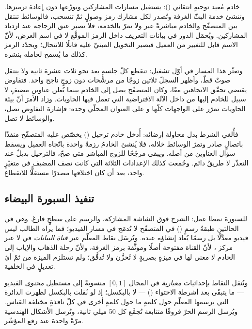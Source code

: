 خادم  مُعيد توجيهٍ انتقائي (): يستقبل مسارات المشاركين ويوزّعها دون إعادة ترميزها. وتنشئ خدمة البثّ الغرفة وتُصدر لكل مشارك رمز وصولٍ ثمّ تنسحب، فالوسائط تنتقل بين المتصفّح والخادم مباشرةً عبر  ولا تمرّ بالخدمة، فلا تصير عنق الزجاجة عند ازدياد المشاركين. ويُحمَل الدور في بيانات التعريف داخل الرمز الموقَّع لا في اسم العرض، لأنّ الاسم قابل للتغيير من العميل فيصير التخويل المبنيّ عليه قابلًا للانتحال؛ ويحدّد الرمز كذلك ما يُسمح لحامله بنشره.

وتعثّر هذا المسار في أوّل تشغيل: تنقطع كلّ جلسةٍ بعد نحو ثلاث عشرة ثانية ولا ينتقل صوتٌ قطّ، وأظهر السجلّ ثلاثين زوجًا من مرشَّحات  دون زوجٍ ناجح واحد. فتفاوض  يقتضي تحقّق الاتجاهين معًا، وكان المتصفّح يصل إلى الخادم بينما يُعلن عناوين مضيفٍ لا سبيل للخادم إليها من داخل الآلة الافتراضية التي تعمل فيها الحاويات. وزاد الأمرَ أنّ بيئة الحاويات تمرّر  على الواجهات كلّها و على العنوان المحلّي وحده: فإشارة التفاوض تصل، والوسائط لا تصل.

فأُلغي الشرط بدل محاولة إرضائه: أُدخل خادم ترحيل () يخصّص عليه المتصفّح منفذًا باتصالٍ صادر وتمرّ الوسائط خلاله، فلا يُنشئ الخادمُ رزمةً واحدة باتّجاه العميل ويسقط سؤال العناوين من أصله. ويبقى  مرجّحًا للزوج المباشر متى صحّ، فالترحيل بديلٌ عند التعذّر لا طريقٌ دائم. وجُمعت كذلك الإعدادات الثلاثة التي كانت تصف المضيف في متغيّرٍ واحد، بعد أن كان اختلافها مصدرًا مستقلًّا للانقطاع.

\subsection{تنفيذ السبورة البيضاء}

للسبورة نمطا عمل: الشرح فوق الشاشة المشارَكة، والرسم على سطحٍ فارغ. وهي في الحالتين طبقةُ رسمٍ () في المتصفّح لا تُدمَج في مسار الفيديو؛ فما يراه الطالب ليس فيديو معدَّلًا بل رسمًا يُعاد إنشاؤه عنده. وتُرسَل نقاط المعلّم عبر \emph{قناة البيانات} في  لا عبر مركز ، لأنّ القناة مفتوحة أصلًا وموثَّقة برمز الغرفة، ولأنّ رحلة الذهاب والإياب إلى الخادم لا معنى لها في ميزةٍ بصريةٍ لا تُخزَّن ولا تُدقَّق؛ ولم تستلزم الميزة من ثمّ أيّ تعديلٍ في الخلفية.

وتُنقل النقاط بإحداثيات \emph{معيارية} في المجال $[0,1]$ منسوبةً إلى مستطيل \emph{محتوى} الفيديو — ما يتبقّى بعد أشرطة الاحتواء () — لا بالبكسل؛ إذ لو نُقلت بالبكسل لظهرت الدائرة التي يرسمها المعلّم حول كلمةٍ ما حول كلمةٍ أخرى في كلّ نافذةٍ مختلفة القياس. ويُرسل الرسم الحرّ فروقًا متتابعة تُجمَّع كل 50 ميلي ثانية، وتُرسل الأشكال الهندسية مرّةً واحدة عند رفع المؤشّر.

